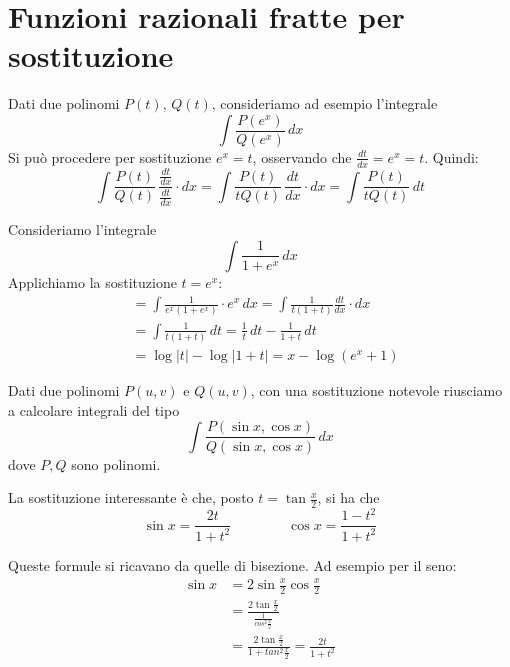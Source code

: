 \section{Funzioni razionali fratte per sostituzione}

Dati due polinomi $P(t)$, $Q(t)$, consideriamo ad esempio l'integrale
\begin{equation*}
\int \frac{P(e^x)}{Q(e^x)} \, dx
\end{equation*}
Si può procedere per sostituzione $e^x = t$, osservando che $\frac{dt}{dx} = e^x = t$. Quindi:
\begin{equation*}
\int \frac{P(t)}{Q(t)} \, \frac{\frac{dt}{dx}}{\frac{dt}{dx}} \cdot dx = \int \frac{P(t)}{tQ(t)} \, \frac{dt}{dx} \cdot dx = 
\int \frac{P(t)}{tQ(t)} \, dt
\end{equation*}

\begin{example}
Consideriamo l'integrale
\begin{equation*}
\int \frac{1}{1+e^x} \, dx
\end{equation*}
Applichiamo la sostituzione $t = e^x$:
\begin{align*}
&= \int \frac{1}{e^x(1+e^x)} \cdot e^x \, dx = \int \frac{1}{t(1+t)} \frac{dt}{dx} \cdot dx \\
&= \int \frac{1}{t(1+t)} \, dt = \frac{1}{t} \, dt - \frac{1}{1+t} \, dt \\ 
&= \log |t| - \log |1+t| = x - \log(e^x+1)
\end{align*}
\end{example}

Dati due polinomi $P(u,v)$ e $Q(u,v)$, con una sostituzione notevole riusciamo a calcolare integrali del tipo
\begin{equation*}
\int \frac{P(\sin x, \cos x)}{Q(\sin x, \cos x)} \, dx
\end{equation*}
dove $P, Q$ sono polinomi.

La sostituzione interessante è che, posto $t = \tan \frac{x}{2}$, si ha che
\begin{equation*}
\sin x = \frac{2t}{1+t^2} \qquad \qquad \cos x = \frac{1-t^2}{1+t^2}
\end{equation*}

Queste formule si ricavano da quelle di bisezione. Ad esempio per il seno:
\begin{align*}
\sin x &= 2 \sin \frac{x}{2} \cos \frac{x}{2} \\
&= \frac{2\tan \frac{x}{2}}{\frac{1}{cos^2 \frac{x}{2}}} \\
&= \frac{2\tan \frac{x}{2}}{1+tan^2 \frac{x}{2}} = \frac{2t}{1+t^2}
\end{align*}

